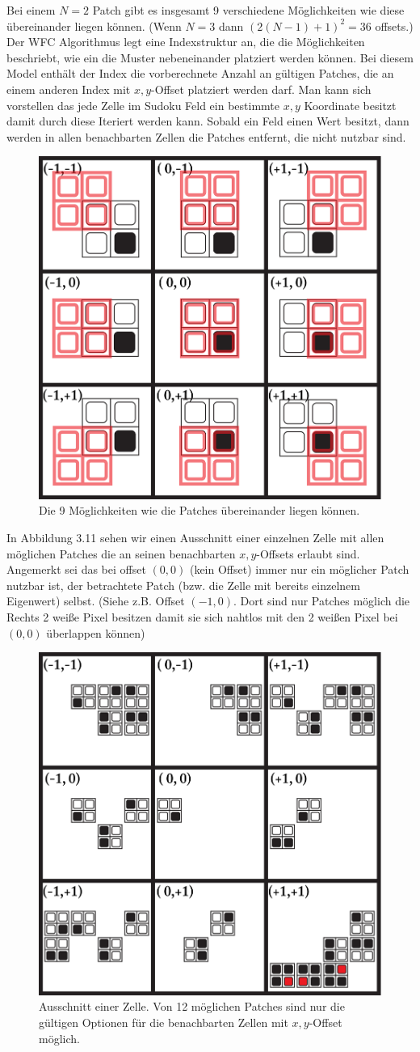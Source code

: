 \documentclass[12pt, a4paper,twoside,openright]{report}
\begin{document}
Bei einem $N = 2$ Patch gibt es insgesamt 9 verschiedene Möglichkeiten wie diese übereinander liegen können.
{(Wenn $N = 3$ dann $(2(N - 1) + 1)^2 = 36$ offsets.)}
Der WFC Algorithmus legt eine Indexstruktur an, die die Möglichkeiten beschriebt, wie ein die Muster nebeneinander platziert werden können.
Bei diesem Model enthält der Index die vorberechnete Anzahl an gültigen Patches, die an einem anderen Index mit $x,y$-Offset platziert werden darf. 
Man kann sich vorstellen das jede Zelle im Sudoku Feld ein bestimmte $x,y$ Koordinate besitzt damit durch diese Iteriert werden kann.
Sobald ein Feld einen Wert besitzt, dann werden in allen benachbarten Zellen die Patches entfernt, die nicht nutzbar sind. \cite{Karth2017WaveFunctionCollapseIC}

\begin{figure}[H]
    \centering
    \includegraphics[width=0.5\linewidth]{images/red-maze-offset.png}%
    \caption{Die 9 Möglichkeiten wie die Patches übereinander liegen können.}%
\end{figure}

In Abbildung 3.11 sehen wir einen Ausschnitt einer einzelnen Zelle mit allen möglichen Patches die an seinen benachbarten $x,y$-Offsets erlaubt sind.
Angemerkt sei das bei offset $(0,0)$ {(kein Offset)} immer nur ein möglicher Patch nutzbar ist, der betrachtete Patch {(bzw. die Zelle mit bereits einzelnem Eigenwert)} selbst.
{(Siehe z.B. Offset $(-1,0)$. Dort sind nur Patches möglich die Rechts 2 weiße Pixel besitzen damit sie sich nahtlos mit den 2 weißen Pixel bei $(0,0)$ überlappen können)} \cite{Karth2017WaveFunctionCollapseIC}

\begin{figure}[H]
    \centering
    \includegraphics[width=0.5\linewidth]{images/red-maze-offset-example.png}%
    \caption{Ausschnitt einer Zelle. Von 12 möglichen Patches sind nur die gültigen Optionen für die benachbarten Zellen mit $x,y$-Offset möglich.}%
\end{figure}
\end{document}
